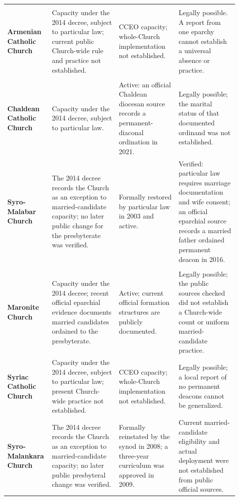 \begin{landscape}
\begin{longtable}{>{\bfseries\RaggedRight\arraybackslash}p{0.15\linewidth}>{\RaggedRight\arraybackslash}p{0.29\linewidth}>{\RaggedRight\arraybackslash}p{0.25\linewidth}>{\RaggedRight\arraybackslash}p{0.25\linewidth}}
\addlinespace[0.35em]
\multicolumn{4}{l}{\textit{Armenian tradition}}\\*
Armenian Catholic Church & Capacity under the 2014 decree, subject to particular law; current public Church-wide rule and practice not established. & CCEO capacity; whole-Church implementation not established. & Legally possible. A report from one eparchy cannot establish a universal absence or practice.\\

\addlinespace[0.35em]
\multicolumn{4}{l}{\textit{East-Syriac tradition}}\\*
Chaldean Catholic Church & Capacity under the 2014 decree, subject to particular law. & Active: an official Chaldean diocesan source records a permanent-diaconal ordination in 2021. & Legally possible; the marital status of that documented ordinand was not established.\\
Syro-Malabar Church & The 2014 decree records the Church as an exception to married-candidate capacity; no later public change for the presbyterate was verified. & Formally restored by particular law in 2003 and active. & Verified: particular law requires marriage documentation and wife consent; an official eparchial source records a married father ordained permanent deacon in 2016.\\

\addlinespace[0.35em]
\multicolumn{4}{l}{\textit{West-Syriac or Antiochene tradition}}\\*
Maronite Church & Capacity under the 2014 decree; recent official eparchial evidence documents married candidates ordained to the presbyterate. & Active; current official formation structures are publicly documented. & Legally possible; the public sources checked did not establish a Church-wide count or uniform married-candidate practice.\\
Syriac Catholic Church & Capacity under the 2014 decree, subject to particular law; present Church-wide practice not established. & CCEO capacity; whole-Church implementation not established. & Legally possible; a local report of no permanent deacons cannot be generalized.\\
Syro-Malankara Church & The 2014 decree records the Church as an exception to married-candidate capacity; no later public presbyteral change was verified. & Formally reinstated by the synod in 2008; a three-year curriculum was approved in 2009. & Current married-candidate eligibility and actual deployment were not established from public official sources.\\


\end{longtable}
\end{landscape}
